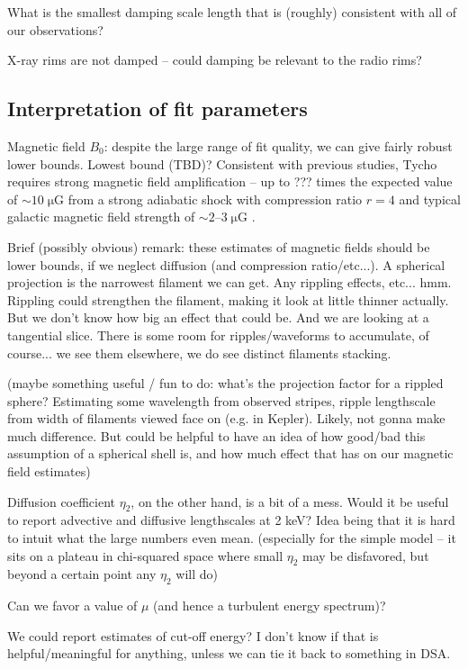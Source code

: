 \documentclass[iop, apj, numberedappendix, twocolappendix]{emulateapj}
\newcommand*{\mt}{\mathrm}
\newcommand*{\unit}[1]{\;\mt{#1}}  %
\newcommand*{\abt}{\mathord{\sim}} %
\begin{document}
What is the smallest damping scale length that is (roughly) consistent with all
of our observations?

X-ray rims are not damped -- could damping be relevant to the radio rims?

\subsection{Interpretation of fit parameters}

Magnetic field $B_0$: despite the large range of fit quality, we can give
fairly robust lower bounds.  Lowest bound (TBD)?  Consistent with previous
studies, Tycho requires strong magnetic field amplification -- up to ??? times
the expected value of $\abt 10 \unit{\mu G}$ from a strong adiabatic shock with
compression ratio $r=4$ and typical galactic magnetic field strength of $\abt
2$--$3 \unit{\mu G}$ \citep{lyne1989, han2006}.

Brief (possibly obvious) remark: these estimates of magnetic fields should be
lower bounds, if we neglect diffusion (and compression ratio/etc...).
A spherical projection is the narrowest filament we can get.
Any rippling effects, etc... hmm.  Rippling could strengthen the filament,
making it look at little thinner actually.  But we don't know how big an effect
that could be.  And we are looking at a tangential slice.  There is some room
for ripples/waveforms to accumulate, of course... we see them elsewhere, we do
see distinct filaments stacking.

(maybe something useful / fun to do: what's the projection factor for a rippled
sphere?  Estimating some wavelength from observed stripes, ripple
lengthscale from width of filaments viewed face on (e.g. in Kepler).  Likely,
not gonna make much difference.  But could be helpful to have an idea of how
good/bad this assumption of a spherical shell is, and how much effect that has
on our magnetic field estimates)

Diffusion coefficient $\eta_2$, on the other hand, is a bit of a mess.
Would it be useful to report advective and diffusive lengthscales at 2 keV?
Idea being that it is hard to intuit what the large numbers even mean.
(especially for the simple model -- it sits on a plateau in chi-squared space
where small $\eta_2$ may be disfavored, but beyond a certain point any $\eta_2$
will do)

Can we favor a value of $\mu$ (and hence a turbulent energy spectrum)?

We could report estimates of cut-off energy?  I don't know if that is
helpful/meaningful for anything, unless we can tie it back to something in DSA.
\end{document}
